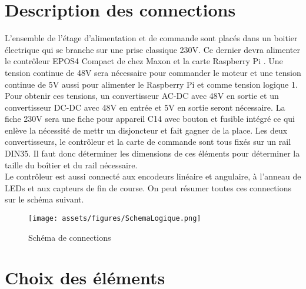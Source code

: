 \section{Description des connections}\label{sec:DescConnect}
L'ensemble de l'étage d'alimentation et de commande sont placés dans un boitier électrique qui se branche sur une prise classique 230V. Ce dernier
devra alimenter le contrôleur EPOS4 Compact de chez Maxon \cite{Maxon} et la carte Raspberry Pi \cite{RaspberryPi}. Une tension continue de 48V
sera nécessaire pour commander le moteur et une tension continue de 5V aussi pour alimenter le Raspberry Pi et comme tension logique 1. Pour obtenir
ces tensions, un convertisseur AC-DC avec 48V en sortie et un convertisseur DC-DC avec 48V en entrée et 5V en sortie seront nécessaire. La fiche 230V
sera une fiche pour appareil C14 avec bouton et fusible intégré ce qui enlève la nécessité de mettr un disjoncteur et fait gagner de la place. Les deux
convertisseurs, le contrôleur et la carte de commande sont tous fixés sur un rail DIN35. Il faut donc déterminer les dimensions de ces éléments pour
déterminer la taille du boîtier et du rail nécessaire.\\

Le contrôleur est aussi connecté aux encodeurs linéaire et angulaire, à l'anneau de LEDs et aux capteurs de fin de course. On peut résumer toutes
ces connections sur le schéma suivant.

\begin{figure}[H]
    \centering
    \texttt{[image: assets/figures/SchemaLogique.png]}
    \caption{Schéma de connections}
    \label{fig:SchemaConnec}
\end{figure}

\section{Choix des éléments}\label{sec:ChoixElem}

